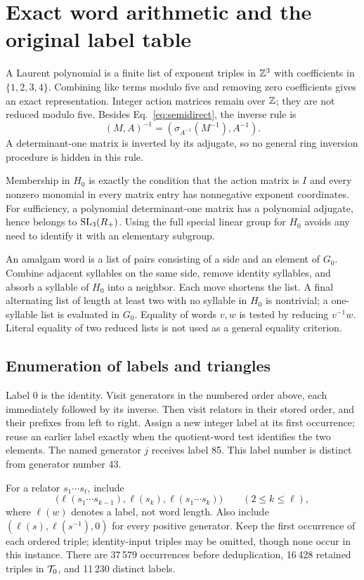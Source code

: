 \section{Exact word arithmetic and the original label table}\label{sec:arithmetic}

A Laurent polynomial is a finite list of exponent triples in $\mathbb Z^3$ with coefficients
in $\{1,2,3,4\}$. Combining like terms modulo five and removing zero coefficients gives
an exact representation. Integer action matrices remain over $\mathbb Z$; they are not reduced
modulo five. Besides Eq.~\eqref{eq:semidirect}, the inverse rule is
\begin{equation}
 (M,A)^{-1}=(\sigma_{A^{-1}}(M^{-1}),A^{-1}).
\end{equation}
A determinant-one matrix is inverted by its adjugate, so no general ring inversion procedure
is hidden in this rule.

Membership in $H_0$ is exactly the condition that the action matrix is $I$ and every
nonzero monomial in every matrix entry has nonnegative exponent coordinates. For sufficiency,
a polynomial determinant-one matrix has a polynomial adjugate, hence belongs to
$\operatorname{SL}_3(R_+)$. Using the full special linear group for $H_0$ avoids any need to identify
it with an elementary subgroup.

An amalgam word is a list of pairs consisting of a side and an element of $G_0$. Combine
adjacent syllables on the same side, remove identity syllables, and absorb a syllable of
$H_0$ into a neighbor. Each move shortens the list. A final alternating list of length at
least two with no syllable in $H_0$ is nontrivial; a one-syllable list is evaluated in $G_0$.
Equality of words $v,w$ is tested by reducing $v^{-1}w$. Literal equality of two reduced
lists is not used as a general equality criterion.

\subsection{Enumeration of labels and triangles}
Label 0 is the identity. Visit generators in the numbered order above,
each immediately followed by its inverse. Then visit relators in their stored order, and
their prefixes from left to right. Assign a new integer label at its first occurrence;
reuse an earlier label exactly when the quotient-word test identifies the two elements.
The named generator $j$ receives label 85. This label number is distinct from generator
number 43.

For a relator $s_1\cdots s_\ell$, include
\begin{equation}
 \bigl(\ell(s_1\cdots s_{k-1}),\ell(s_k),\ell(s_1\cdots s_k)\bigr)
 \qquad(2\le k\le\ell),
 \label{eq:prefixes}
\end{equation}
where $\ell(w)$ denotes a label, not word length. Also include
$(\ell(s),\ell(s^{-1}),0)$ for every positive generator. Keep the first occurrence of
each ordered triple; identity-input triples may be omitted, though none occur in this
instance. There are 37\,579 occurrences before deduplication, 16\,428 retained triples
in $\mathcal T_0$, and 11\,230 distinct labels.

